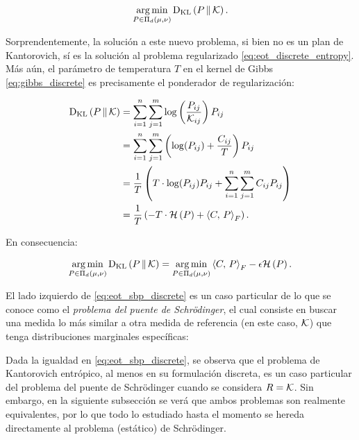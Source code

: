 \begin{equation*}
	\operatorname*{arg\,min}_{P\in\Pi_d(\mu,\nu)} \operatorname{D_{KL}}\left(P\,\|\,\mathcal{K}\right).
\end{equation*}

Sorprendentemente, la solución a este nuevo problema, si bien no es un plan de Kantorovich, sí es la solución al problema regularizado \eqref{eq:eot_discrete_entropy}. Más aún, el parámetro de temperatura $T$ en el kernel de Gibbs \eqref{eq:gibbs_discrete} es precisamente el ponderador de regularización:

\begin{align*}
	\operatorname{D_{KL}}\left(P\,\|\,\mathcal{K}\right) &= \sum_{i=1}^n\sum_{j=1}^m \log\left(\frac{P_{ij}}{\mathcal{K}_{ij}}\right) P_{ij}\\
	&= \sum_{i=1}^n\sum_{j=1}^m \left(\log(P_{ij}) + \frac{C_{ij}}{T}\right)P_{ij}\\
	&= \frac{1}{T}\left(T\cdot\log(P_{ij})P_{ij}+\sum_{i=1}^n\sum_{j=1}^m C_{ij}P_{ij}\right)\\
	&= \frac{1}{T}\left(- T\cdot\mathcal{H}\left(P\right) + \left\langle C,\,P\right\rangle_F\right).
\end{align*}

En consecuencia:

\begin{equation}
	\label{eq:eot_sbp_discrete}
	\operatorname*{arg\,min}_{P\in\Pi_d(\mu,\nu)} \operatorname{D_{KL}}\left(P\,\|\,\mathcal{K}\right)
	= \operatorname*{arg\,min}_{P\in\Pi_d(\mu,\nu)} \left\langle C,\,P\right\rangle_F - \epsilon \mathcal{H}\left(P\right).
\end{equation}

El lado izquierdo de \eqref{eq:eot_sbp_discrete} es un caso particular de lo que se conoce como el \textit{problema del puente de Schrödinger}, el cual consiste en buscar una medida lo más similar a otra medida de referencia (en este caso, $\mathcal{K}$) que tenga distribuciones marginales específicas:


Dada la igualdad en \eqref{eq:eot_sbp_discrete}, se observa que el problema de Kantorovich entrópico, al menos en su formulación discreta, es un caso particular del problema del puente de Schrödinger cuando se considera $R=\mathcal{K}$. Sin embargo, en la siguiente subsección se verá que ambos problemas son realmente equivalentes, por lo que todo lo estudiado hasta el momento se hereda directamente al problema (estático) de Schrödinger.

